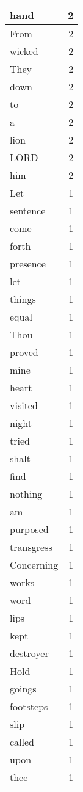\begin{center}
\begin{longtable}{l|r}
hand & 2 \\ \hline
From & 2 \\ \hline
wicked & 2 \\ \hline
They & 2 \\ \hline
down & 2 \\ \hline
to & 2 \\ \hline
a & 2 \\ \hline
lion & 2 \\ \hline
LORD & 2 \\ \hline
him & 2 \\ \hline
Let & 1 \\ \hline
sentence & 1 \\ \hline
come & 1 \\ \hline
forth & 1 \\ \hline
presence & 1 \\ \hline
let & 1 \\ \hline
things & 1 \\ \hline
equal & 1 \\ \hline
Thou & 1 \\ \hline
proved & 1 \\ \hline
mine & 1 \\ \hline
heart & 1 \\ \hline
visited & 1 \\ \hline
night & 1 \\ \hline
tried & 1 \\ \hline
shalt & 1 \\ \hline
find & 1 \\ \hline
nothing & 1 \\ \hline
am & 1 \\ \hline
purposed & 1 \\ \hline
transgress & 1 \\ \hline
Concerning & 1 \\ \hline
works & 1 \\ \hline
word & 1 \\ \hline
lips & 1 \\ \hline
kept & 1 \\ \hline
destroyer & 1 \\ \hline
Hold & 1 \\ \hline
goings & 1 \\ \hline
footsteps & 1 \\ \hline
slip & 1 \\ \hline
called & 1 \\ \hline
upon & 1 \\ \hline
thee & 1 \\ \hline

\end{longtable}
\end{center}
